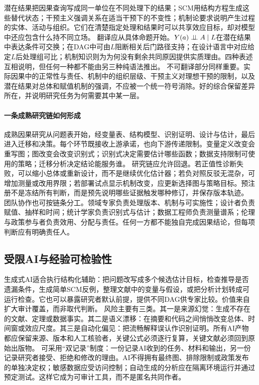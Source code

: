 潜在结果把因果查询写成同一单位在不同处理下的结果；SCM用结构方程生成这些替代状态；干预主义强调关系在适当干预下的不变性；机制论要求说明产生过程的实体、活动与组织。它们在清楚指定处理和结果时可以共享效应目标，却对模型中还应包含什么持不同立场。
翻译应从具体命题开始。$Y(a)\mathrel{\perp\!\!\!\perp} A\mid L$在潜在结果中表达条件可交换；在DAG中可由$L$阻断相关后门路径支持；在设计语言中对应给定$L$后处理组可比；机制知识则为为何没有剩余共同原因提供实质理由。四种表述互相说明，但任何一种都不能由另三种纯语法推出。
不可翻译部分同样重要。实际因果中的正常性与责任、机制中的组织层级、干预主义对理想干预的限制，以及潜在结果对总体和赋值机制的强调，不应被一个统一符号消除。好的综合保留差异所在，并说明研究任务为何需要其中某一层。

\paragraph{一条成熟研究链如何形成}

成熟因果研究从问题表开始，经变量表、结构模型、识别证明、设计与估计，最后进入迁移和决策。每个环节既接收上游承诺，也向下游传递限制。变量定义改变会重写图；图改变会改变识别式；识别式决定需要估计哪些函数；数据支持限制可使用的策略；迁移分析决定结论能服务谁。
研究链应允许回退。若正值性诊断失败，可以缩小总体或重新设计，而不是继续优化估计器；若负对照反驳无混杂，可增加测量或改用界限；若部署试点显示机制改变，应更新选择图与策略目标。预注册不是冻结所有判断，而是预先说明哪些证据触发哪种修订，并保存版本轨迹。
团队协作也可按链条分工。领域专家负责处理版本、机制与可实施性；设计者负责赋值、抽样和时间；统计学家负责识别式与估计；数据工程师负责测量谱系；伦理与政策参与者负责效用、分配与责任。任何一方都不能独自完成因果结论，但每项判断应有明确责任人。

\subsection{受限AI与经验可检验性}

生成式AI适合执行结构化辅助：把问题改写成多个候选估计目标，检查推导是否遗漏条件，生成简单SCM反例，整理文献中的变量与假设，或把分析计划转成可运行检查。它也可以暴露研究者默认前提，提供不同DAG供专家比较。价值来自扩大审计覆盖，而非取代判断。
风险主要有三类。其一是来源幻觉：生成不存在的文献、定理或数据事实。其二是语义漂移：在摘要和代码之间悄悄改变总体、时间窗或效应尺度。其三是自动化偏见：把流畅解释误认作识别证明。所有AI产物都应保留来源、版本和人工核验者，关键公式必须逐行复算，关键文献必须回到原始出版物。
可采用“双记录”制度：一份记录AI收到的任务、材料和输出，另一份记录研究者接受、拒绝和修改的理由。AI不得拥有最终图、排除限制或政策发布的单独决定权；敏感数据应受访问控制；自动生成的分析应在隔离环境运行并通过预定测试。这样它成为可审计工具，而不是匿名共同作者。

